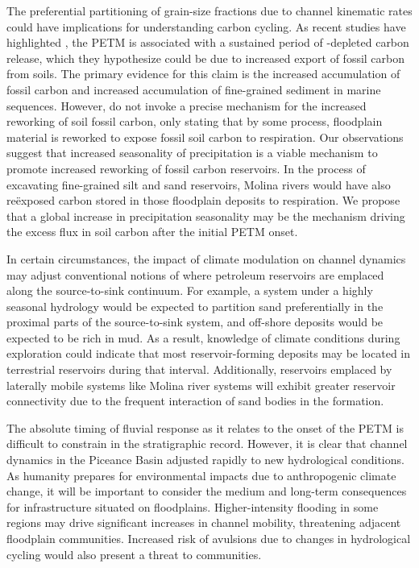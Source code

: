 \documentclass[draft]{compact_proposal}\usepackage[]{graphicx}\usepackage[]{color}
\newcommand{\del}[3]{\ce{\delta^#1#2_{#3}}}
\begin{document}
The preferential partitioning of grain-size fractions due to channel kinematic rates could have implications for understanding carbon cycling.
As recent studies have highlighted \cnote[Lyons], the PETM is associated with a sustained period of \del{13}{C}{}-depleted carbon release, which they hypothesize could be due to increased export of fossil carbon from soils.
The primary evidence for this claim is the increased accumulation of fossil carbon and increased accumulation of fine-grained sediment in marine sequences.
However, \cnote[Lyons] do not invoke a precise mechanism for the increased reworking of soil fossil carbon, only stating that by some process, floodplain material is reworked to expose fossil soil carbon to respiration.
Our observations suggest that increased seasonality of precipitation is a viable mechanism to promote increased reworking of fossil carbon reservoirs.
In the process of excavating fine-grained silt and sand reservoirs, Molina rivers would have also re\"exposed carbon stored in those floodplain deposits to respiration.
We propose that a global increase in precipitation seasonality may be the mechanism driving the excess flux in soil carbon after the initial PETM onset.

In certain circumstances, the impact of climate modulation on channel dynamics may adjust conventional notions of where petroleum reservoirs are emplaced along the source-to-sink continuum.
For example, a system under a highly seasonal hydrology would be expected to partition sand preferentially in the proximal parts of the source-to-sink system, and off-shore deposits would be expected to be rich in mud.
As a result, knowledge of climate conditions during exploration could indicate that most reservoir-forming deposits may be located in terrestrial reservoirs during that interval.
Additionally, reservoirs emplaced by laterally mobile systems like Molina river systems will exhibit greater reservoir connectivity due to the frequent interaction of sand bodies in the formation.

The absolute timing of fluvial response as it relates to the onset of the PETM is difficult to constrain in the stratigraphic record.
However, it is clear that channel dynamics in the Piceance Basin adjusted rapidly to new hydrological conditions.
As humanity prepares for environmental impacts due to anthropogenic climate change, it will be important to consider the medium and long-term consequences for infrastructure situated on floodplains.
Higher-intensity flooding in some regions may drive significant increases in channel mobility, threatening adjacent floodplain communities.
Increased risk of avulsions due to changes in hydrological cycling would also present a threat to communities.
\end{document}
